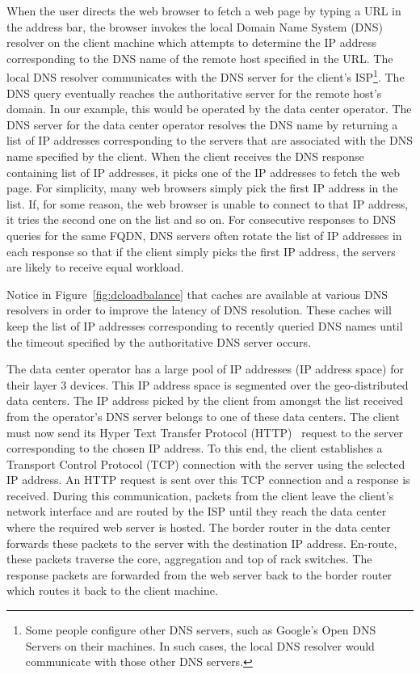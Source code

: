 When the user directs the web browser to fetch a web page by typing a URL in the address bar, the browser invokes the local Domain Name System (DNS) resolver on the client machine which attempts to determine the IP address corresponding to the DNS name of the remote host specified in the URL. The local DNS resolver communicates with the DNS server for the client's ISP\footnote{Some people configure other DNS servers, such as Google's Open DNS Servers on their machines. In such cases, the local DNS resolver would communicate with those other DNS servers.}. The DNS query eventually reaches the authoritative server for the remote host's domain. In our example, this would be operated by the data center operator. The DNS server for the data center operator resolves the DNS name by returning a list of IP addresses corresponding to the servers that are associated with the DNS name specified by the client. When the client receives the DNS response containing list of IP addresses, it picks one of the IP addresses to fetch the web page. For simplicity, many web browsers simply pick the first IP address in the list. If, for some reason, the web browser is unable to connect to that IP address, it tries the second one on the list and so on. For consecutive responses to DNS queries for the same FQDN, DNS servers often rotate the list of IP addresses in each response so that if the client simply picks the first IP address, the servers are likely to receive equal workload.

Notice in Figure~\ref{fig:dcloadbalance} that caches are available at various DNS resolvers in order to improve the latency of DNS resolution. These caches will keep the list of IP addresses corresponding to recently queried DNS names until the timeout specified by the authoritative DNS server occurs.

The data center operator has a large pool of IP addresses (IP address space) for their layer 3 devices. This IP address space is segmented over the geo-distributed data centers. The IP address picked by the client from amongst the list received from the operator's DNS server belongs to one of these data centers. The client must now send its Hyper Text Transfer Protocol (HTTP)~\cite{rfc1945} request to the server corresponding to the chosen IP address. To this end, the client establishes a Transport Control Protocol (TCP) connection with the server using the selected IP address. An HTTP request is sent over this TCP connection and a response is received. During this communication, packets from the client leave the client's network interface and are routed by the ISP until they reach the data center where the required web server is hosted. The border router in the data center forwards these packets to the server with the destination IP address. En-route, these packets traverse the core, aggregation and top of rack switches. The response packets are forwarded from the web server back to the border router which routes it back to the client machine.

